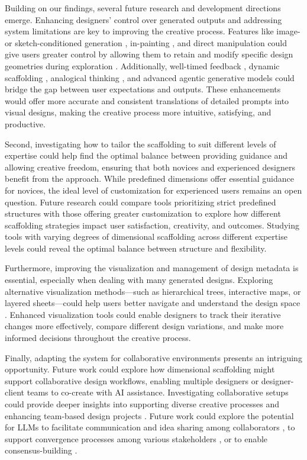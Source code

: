 Building on our findings, several future research and development directions emerge. Enhancing designers’ control over generated outputs and addressing system limitations are key to improving the creative process. Features like image- \cite{zhang2023adding} or sketch-conditioned generation \cite{chang2020workflow, sarukkai2024block}, in-painting \cite{lugmayr2022repaint}, and direct manipulation \cite{pan2023drag} could give users greater control by allowing them to retain and modify specific design geometries during exploration \cite{brade2023promptify}. Additionally, well-timed feedback \cite{yen2024give}, dynamic scaffolding \cite{xu2024jamplate, suh2024luminate}, analogical thinking \cite{lin2025inkspire, kang2024biospark}, and advanced agentic generative models \cite{park2023generative, shaikh2024rehearsal} could bridge the gap between user expectations and outputs. These enhancements would offer more accurate and consistent translations of detailed prompts into visual designs, making the creative process more intuitive, satisfying, and productive.

Second, investigating how to tailor the scaffolding to suit different levels of expertise could help find the optimal balance between providing guidance and allowing creative freedom, ensuring that both novices and experienced designers benefit from the approach. 
While predefined dimensions offer essential guidance for novices, the ideal level of customization for experienced users remains an open question. Future research could compare tools prioritizing strict predefined structures with those offering greater customization to explore how different scaffolding strategies impact user satisfaction, creativity, and outcomes. Studying tools with varying degrees of dimensional scaffolding across different expertise levels could reveal the optimal balance between structure and flexibility.

Furthermore, improving the visualization and management of design metadata is essential, especially when dealing with many generated designs. Exploring alternative visualization methods—such as hierarchical trees, interactive maps, or layered sheets—could help users better navigate and understand the design space \cite{jiang2023graphologue, wootton2024charting}. Enhanced visualization tools could enable designers to track their iterative changes more effectively, compare different design variations, and make more informed decisions throughout the creative process.

Finally, adapting the system for collaborative environments presents an intriguing opportunity. Future work could explore how dimensional scaffolding might support collaborative design workflows, enabling multiple designers or designer-client teams to co-create with AI assistance. Investigating collaborative setups could provide deeper insights into supporting diverse creative processes and enhancing team-based design projects \cite{bodker2000creativity}. Future work could explore the potential for LLMs to facilitate communication and idea sharing among collaborators \cite{he2024ai, heyman2024supermind}, to support convergence processes among various stakeholders \cite{rayan2024exploring}, or to enable consensus-building \cite{liu2018consensus}.


